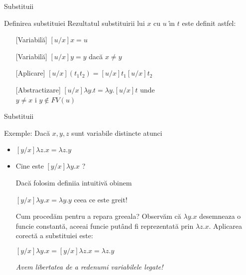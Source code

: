 \documentclass[xcolor=pdftex,romanian,colorlinks]{beamer}
\begin{document}
\begin{frame}[fragile]{ Substitu\ts ii}
\vspace*{0.3cm}

\begin{block}{Definirea substitu\ts iei}
 Rezultatul substituirii lui $x$ cu $u$ \^{\i}n $t$ este definit astfel:

\begin{itemize}
\item[][Variabil\u a] $[u/x]x = u$
\item[][Variabil\u a] $[u/x]y= y$ dac\u a $x\neq y$
\item[][Aplicare] $[u/x](t_1t_2)= [u/x]t_1[u/x]t_2$
\item[][Abstractizare] $[u/x]\lambda y.t=\lambda y. [u/x]t $ unde\\
\hspace*{3cm} $y\neq x$ \sh i $y\not\in FV(u)$
\end{itemize}
\end{block}
\end{frame}

\begin{frame}[fragile]{ Substitu\ts ii}

Exemple:
Dac\u a $x,y,z$ sunt variabile distincte atunci
\begin{itemize}
\item $[y/x]\lambda z. x=\lambda z. y$ 
 \medskip
 
\item  Cine este $[y/x] \lambda y.x$ ?\pause

Dac\u a  folosim defini\ts ia intuitiv\u a ob\ts inem 

$[y/x] \lambda y.x = \lambda y. y$ ceea ce este gre\sh it!\pause


\medskip
Cum proced\u am pentru a repara gre\sh eala? Observ\u am c\u a $\lambda y.x$ desemneaza o func\ts ie constant\u a, aceea\sh i func\ts ie put\^{a}nd fi reprezentat\u a  prin $\lambda z.x$. Aplicarea corect\u a a substitu\ts iei este:

   $[y/x] \lambda y.x=[y/x] \lambda z.x=\lambda z.y$
   
   \pause\medskip
   
   
 {\it Avem libertatea de a redenumi variabilele legate!}
\end{itemize}
\end{frame}
\end{document}
